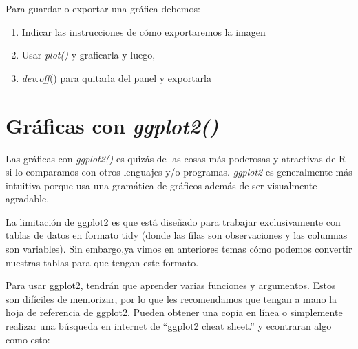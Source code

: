 \documentclass[
]{book}
\newenvironment{Shaded}{\begin{snugshade}}{\end{snugshade}}
\newcommand{\AttributeTok}[1]{\textcolor[rgb]{0.13,0.29,0.53}{#1}}
\newcommand{\DecValTok}[1]{\textcolor[rgb]{0.00,0.00,0.81}{#1}}
\newcommand{\FunctionTok}[1]{\textcolor[rgb]{0.13,0.29,0.53}{\textbf{#1}}}
\newcommand{\NormalTok}[1]{#1}
\newcommand{\SpecialCharTok}[1]{\textcolor[rgb]{0.81,0.36,0.00}{\textbf{#1}}}
\newcommand{\StringTok}[1]{\textcolor[rgb]{0.31,0.60,0.02}{#1}}
\begin{document}
Para guardar o exportar una gráfica debemos:

\begin{enumerate}
\def\labelenumi{\arabic{enumi}.}
\item
  Indicar las instrucciones de cómo exportaremos la imagen
\item
  Usar \emph{plot()} y graficarla y luego,
\item
  \emph{dev.off}() para quitarla del panel y exportarla
\end{enumerate}

\begin{Shaded}
\end{Shaded}

\section{\texorpdfstring{Gráficas con \emph{ggplot2()}}{Gráficas con ggplot2()}}\label{gruxe1ficas-con-ggplot2}

Las gráficas con \emph{ggplot2()} es quizás de las cosas más poderosas y atractivas de R si lo comparamos con otros lenguajes y/o programas.
\emph{ggplot2} es generalmente más intuitiva porque usa una gramática de gráficos además de ser visualmente agradable.

La limitación de ggplot2 es que está diseñado para trabajar exclusivamente con tablas de datos en formato tidy (donde las filas son observaciones y las columnas son variables).
Sin embargo,ya vimos en anteriores temas cómo podemos convertir nuestras tablas para que tengan este formato.

Para usar ggplot2, tendrán que aprender varias funciones y argumentos.
Estos son difíciles de memorizar, por lo que les recomendamos que tengan a mano la hoja de referencia de ggplot2.
Pueden obtener una copia en línea o simplemente realizar una búsqueda en internet de ``ggplot2 cheat sheet.'' y econtraran algo como esto:
\end{document}
